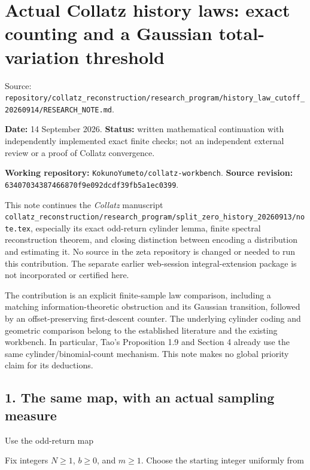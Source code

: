 \chapter{Actual Collatz history laws: exact counting and a Gaussian
total-variation threshold}
{\small\sffamily Source: \nolinkurl{repository/collatz_reconstruction/research_program/history_law_cutoff_20260914/RESEARCH_NOTE.md}.\par}


\textbf{Date:} 14 September 2026. \textbf{Status:} written mathematical
continuation with independently implemented exact finite checks; not an
independent external review or a proof of Collatz convergence.

\textbf{Working repository:} \nolinkurl{KokunoYumeto/collatz-workbench}.
\textbf{Source revision:}
\nolinkurl{63407034387466870f9e092dcdf39fb5a1ec0399}.

This note continues the \emph{Collatz} manuscript
\nolinkurl{collatz_reconstruction/research_program/split_zero_history_20260913/note.tex},
especially its exact odd-return cylinder lemma, finite spectral
reconstruction theorem, and closing distinction between encoding a
distribution and estimating it. No source in the zeta repository is
changed or needed to run this contribution. The separate earlier
web-session integral-extension package is not incorporated or certified
here.

The contribution is an explicit finite-sample law comparison, including
a matching information-theoretic obstruction and its Gaussian
transition, followed by an offset-preserving first-descent counter. The
underlying cylinder coding and geometric comparison belong to the
established literature and the existing workbench. In particular, Tao's
Proposition 1.9 and Section 4 already use the same
cylinder/binomial-count mechanism. This note makes no global priority
claim for its deductions.

\section{1. The same map, with an actual sampling measure}

Use the odd-return map


Fix integers \(N\ge1\), \(b\ge0\), and \(m\ge1\). Choose the starting
integer uniformly from


